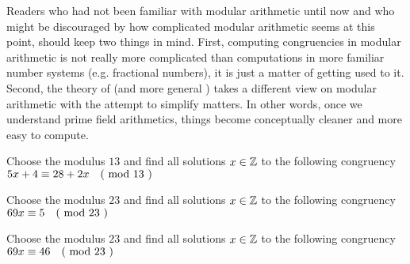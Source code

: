 Readers who had not been familiar with modular arithmetic until now and who might be discouraged by how complicated modular arithmetic seems at this point, should keep two things in mind. First, computing congruencies in modular arithmetic is not really more complicated than computations in more familiar number systems (e.g. fractional numbers), it is just a matter of getting used to it. Second, the theory of  (and more general ) takes a different view on modular arithmetic with the attempt to simplify matters. In other words, once we understand prime field arithmetics, things become conceptually cleaner and more easy to compute.
\begin{exercise}Choose the modulus $13$ and find all solutions $x\in \mathbb{Z}$ to the following congruency $5x+4 \equiv 28+2x \quad \text{( mod } 13 \text{ )}$
\end{exercise}
\begin{exercise}Choose the modulus $23$ and find all solutions $x\in \mathbb{Z}$ to the following congruency $69x \equiv 5 \quad \text{( mod } 23 \text{ )}$
\end{exercise}
\begin{exercise}Choose the modulus $23$ and find all solutions $x\in \mathbb{Z}$ to the following congruency $69x \equiv 46 \quad \text{( mod } 23 \text{ )}$
\end{exercise}

